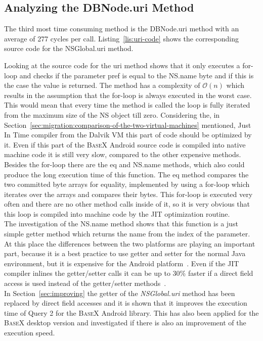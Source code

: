 \subsection*{Analyzing the \textsf{DBNode.uri} Method}
\label{sec:analyzing-the-dbnode.uri-method}
The third most time consuming method is the \textsf{DBNode.uri} method with an average of 277 cycles per call.
Listing~\ref{lis:uri-code} shows the corresponding source code for the \textsf{NSGlobal.uri} method.
		
Looking at the source code for the \textsf{uri} method shows that it only executes a for-loop and checks if the parameter \textsf{pref} is equal to the \textsf{NS.name} byte and if this is the case the value is returned.
The method has a complexity of $\mathcal O(n)$ which results in the assumption that the for-loop is always executed in the worst case.
This would mean that every time the method is called the loop is fully iterated from the maximum size of the \textsf{NS} object till zero.
Considering the, in Section~\ref{sec:migration:comparison-of-the-two-virtual-machines} mentioned, Just In Time compiler from the Dalvik VM this part of code should be optimized by it.
Even if this part of the \textsc{BaseX} Android source code is compiled into native machine code it is still very slow, compared to the other expensive methods.
Besides the for-loop there are the \textsf{eq} and \textsf{NS.name} methods, which also could produce the long execution time of this function.
The \textsf{eq} method compares the two committed byte arrays for equality, implemented by using a for-loop which iterates over the arrays and compares their bytes.
This for-loop is executed very often and there are no other method calls inside of it, so it is very obvious that this loop is compiled into machine code by the JIT optimization routine.\\
The investigation of the \textsf{NS.name} method shows that this function is a just simple getter method which returns the name from the index of the parameter.\\
At this place the differences between the two platforms are playing an important part, because it is a best practice to use getter and setter for the normal Java environment, but it is expensive for the Android platform~\cite{toninievlautatingandroid}.
Even if the JIT compiler inlines the getter/setter calls it can be up to 30\% faster if a direct field access is used instead of the getter/setter methods~\cite{toninianalysis}.\\
In Section~\ref{sec:improving} the getter of the \textit{NSGlobal.uri} method has been replaced by direct field accesses and it is shown that it improves the execution time of Query 2 for the \textsc{BaseX} Android library.
This has also been applied for the \textsc{BaseX} desktop version and investigated if there is also an improvement of the execution speed.

